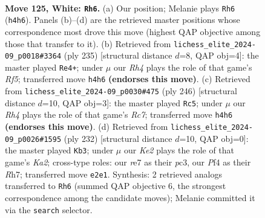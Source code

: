 \documentclass[11pt]{article}
\begin{document}
\clearpage

\begin{figure}[p]\centering
\begin{subfigure}{0.46\textwidth}\centering
\resizebox{\linewidth}{!}{%
\newchessgame
\chessboard[
  setfen={2k5/4r3/4p3/4P3/5P1R/8/4K3/8 w - - 0 125},
  showmover=false,
  pgfstyle=straightmove, color=movearrow, markmove={h4-h6}
]}
\caption{}
\end{subfigure}\hfill
\begin{subfigure}{0.46\textwidth}\centering
\resizebox{\linewidth}{!}{%
\newchessgame
\chessboard[
  setfen={8/7k/6p1/7p/5r1P/8/4K3/7R b - - 97 118},
  showmover=false,
  pgfstyle=straightmove, color=movearrow, markmove={f4-e4}
]}
\caption{}
\end{subfigure}
\\[4pt]
\begin{subfigure}{0.46\textwidth}\centering
\resizebox{\linewidth}{!}{%
\newchessgame
\chessboard[
  setfen={8/2R5/5k2/7p/7P/6P1/6K1/1r6 w - - 93 124},
  showmover=false,
  pgfstyle=straightmove, color=movearrow, markmove={c7-c5}
]}
\caption{}
\end{subfigure}\hfill
\begin{subfigure}{0.46\textwidth}\centering
\resizebox{\linewidth}{!}{%
\newchessgame
\chessboard[
  setfen={3r4/P6R/8/1k6/8/2p5/K7/8 w - - 2 117},
  showmover=false,
  pgfstyle=straightmove, color=movearrow, markmove={a2-b3}
]}
\caption{}
\end{subfigure}
\caption{\textbf{Move 125, White: \texttt{Rh6}.} (a) Our position; Melanie plays \texttt{Rh6} (\texttt{h4h6}). Panels (b)--(d) are the retrieved master positions whose correspondence most drove this move (highest QAP objective among those that transfer to it). (b) Retrieved from \texttt{lichess\_elite\_2024-09\_p0018\#3364} (ply 235) [structural distance $d$=8, QAP obj=4]: the master played \texttt{Re4+}; under $\mu$ our \emph{Rh4} plays the role of that game's \emph{Rf5}; transferred move \texttt{h4h6} \textbf{(endorses this move)}. (c) Retrieved from \texttt{lichess\_elite\_2024-09\_p0030\#475} (ply 246) [structural distance $d$=10, QAP obj=3]: the master played \texttt{Rc5}; under $\mu$ our \emph{Rh4} plays the role of that game's \emph{Rc7}; transferred move \texttt{h4h6} \textbf{(endorses this move)}. (d) Retrieved from \texttt{lichess\_elite\_2024-09\_p0026\#1595} (ply 232) [structural distance $d$=10, QAP obj=0]: the master played \texttt{Kb3}; under $\mu$ our \emph{Ke2} plays the role of that game's \emph{Ka2}; cross-type roles: our \emph{r}e7 as their \emph{p}c3, our \emph{P}f4 as their \emph{R}h7; transferred move \texttt{e2e1}. Synthesis: 2 retrieved analogs transferred to \texttt{Rh6} (summed QAP objective 6, the strongest correspondence among the candidate moves); Melanie committed it via the \texttt{search} selector.}
\label{fig:thought-m248}
\end{figure}
\end{document}
